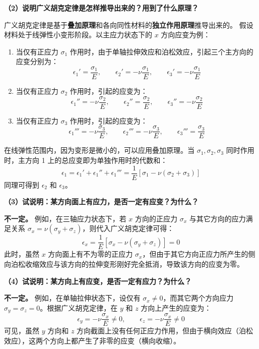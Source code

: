 \documentclass[UTF8,fontset=windows]{ctexart}
\begin{document}
\textbf{（2）说明广义胡克定律是怎样推导出来的？用到了什么原理？}

广义胡克定律是基于\textbf{叠加原理}和各向同性材料的\textbf{独立作用原理}推导出来的。
假设材料处于线弹性小变形阶段。以主应力状态下的 $x$ 方向应变为例：
\begin{enumerate}
    \item 当仅有正应力 $\sigma_1$ 作用时，由于单轴拉伸效应和泊松效应，引起三个主方向的应变分别为：
          \[
              \epsilon_1' = \frac{\sigma_1}{E}, \qquad \epsilon_2' = -\nu \frac{\sigma_1}{E}, \qquad \epsilon_3' = -\nu \frac{\sigma_1}{E}
          \]
    \item 当仅有正应力 $\sigma_2$ 作用时，引起的应变为：
          \[
              \epsilon_1'' = -\nu \frac{\sigma_2}{E}, \qquad \epsilon_2'' = \frac{\sigma_2}{E}, \qquad \epsilon_3'' = -\nu \frac{\sigma_2}{E}
          \]
    \item 当仅有正应力 $\sigma_3$ 作用时，引起的应变为：
          \[
              \epsilon_1''' = -\nu \frac{\sigma_3}{E}, \qquad \epsilon_2''' = -\nu \frac{\sigma_3}{E}, \qquad \epsilon_3''' = \frac{\sigma_3}{E}
          \]
\end{enumerate}
在线弹性范围内，因为变形是微小的，可以应用叠加原理。当 $\sigma_1, \sigma_2, \sigma_3$ 同时作用时，主方向 1 上的总应变即为单独作用时的代数和：
\[
    \epsilon_1 = \epsilon_1' + \epsilon_1'' + \epsilon_1''' = \frac{1}{E} \left[ \sigma_1 - \nu (\sigma_2 + \sigma_3) \right]
\]
同理可得到 $\epsilon_2$ 和 $\epsilon_3$。

\textbf{（3）试说明：某方向面上有应力，是否一定有应变？为什么？}

\textbf{不一定。}
例如，在三轴应力状态下，若 $x$ 方向的正应力 $\sigma_x$ 与其它方向的应力满足关系 $\sigma_x = \nu (\sigma_y + \sigma_z)$，则代入广义胡克定律可得：
\[
    \epsilon_x = \frac{1}{E} \left[ \sigma_x - \nu (\sigma_y + \sigma_z) \right] = 0
\]
此时，虽然 $x$ 方向面上有不为零的正应力 $\sigma_x$，但由于其它方向正应力所产生的侧向泊松收缩效应与该方向的拉伸变形刚好完全抵消，导致该方向的应变为零。

\textbf{（4）试说明：某方向上有应变，是否一定有应力？为什么？}

\textbf{不一定。}
例如，在单轴拉伸状态下，设仅有 $\sigma_x \ne 0$，而其它两个方向应力 $\sigma_y = \sigma_z = 0$。根据广义胡克定律，在 $y$ 和 $z$ 方向上产生的应变为：
\[
    \epsilon_y = -\nu \frac{\sigma_x}{E} \ne 0, \qquad \epsilon_z = -\nu \frac{\sigma_x}{E} \ne 0
\]
可见，虽然 $y$ 方向和 $z$ 方向截面上没有任何正应力作用，但由于横向效应（泊松效应），这两个方向上都产生了非零的应变（横向收缩）。
\end{document}
